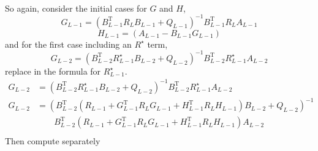 \documentclass{article}
\begin{document}
\paragraph{}
So again, consider the initial cases for $G$ and $H$,
\[ \boxed{ G_{L-1} = \left( B_{L-1}^{\text{T}} R_{L} B_{L-1} + Q_{L-1} \right)^{-1} B_{L-1}^{\text{T}} R_{L} A_{L-1} } \]
\[ \boxed{ H_{L-1} = \left( A_{L-1} - B_{L-1} G_{L-1} \right) } \]
and for the first case including an $R^{\star}$ term,
\[ G_{L-2} = \left( B_{L-2}^{\text{T}} R^{\star}_{L-1} B_{L-2} + Q_{L-2} \right)^{-1} B_{L-2}^{\text{T}} R^{\star}_{L-1} A_{L-2} \]
replace in the formula for $R^{\star}_{L-1}$.
\begin{align*}
G_{L-2} &= \left( B_{L-2}^{\text{T}} R^{\star}_{L-1} B_{L-2} + Q_{L-2} \right)^{-1} B_{L-2}^{\text{T}} R^{\star}_{L-1} A_{L-2} \\
G_{L-2} &= \left( B_{L-2}^{\text{T}} \left( R_{L-1} + G_{L-1}^{\text{T}} R_{L} G_{L-1} + H_{L-1}^{\text{T}} R_{L} H_{L-1} \right) B_{L-2} + Q_{L-2} \right)^{-1} \\
&\qquad B_{L-2}^{\text{T}} \left( R_{L-1} + G_{L-1}^{\text{T}} R_{L} G_{L-1} + H_{L-1}^{\text{T}} R_{L} H_{L-1} \right) A_{L-2} \\
\end{align*}
Then compute separately
\end{document}
